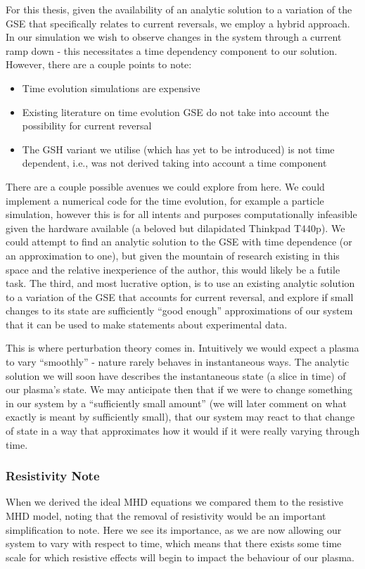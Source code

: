 For this thesis, given the availability of an analytic solution to a variation of 
the GSE that specifically relates to current reversals, we employ a hybrid approach. 
In our simulation we wish to observe changes in the system through a current ramp down
- this necessitates a time dependency component to our solution. However, there are 
a couple points to note:
\begin{itemize}
    \item Time evolution simulations are expensive
    \item Existing literature on time evolution GSE do not take into account the possibility for current 
    reversal
    \item The GSH variant we utilise (which has yet to be introduced) is not time dependent, i.e., 
    was not derived taking into account a time component
\end{itemize}

There are a couple possible avenues we could explore from here. We could implement a numerical code 
for the time evolution, for example a particle simulation, however this is for all intents and purposes
computationally infeasible given the hardware available (a beloved but dilapidated Thinkpad T440p). We could 
attempt to find an analytic solution to the GSE with time dependence (or an approximation to one),
but given the mountain of research existing in this space and the relative inexperience 
of the author, this would likely be a futile task. The third, and most lucrative option, 
is to use an existing analytic solution to a variation of the GSE that accounts for 
current reversal, and explore if small changes to its state
are sufficiently ``good enough'' approximations of our system that it can be used to make 
statements about experimental data.

This is where perturbation theory comes in. Intuitively we would expect a 
plasma to vary ``smoothly'' - nature rarely behaves in instantaneous ways. The 
analytic solution we will soon have describes the instantaneous state (a slice in time) of 
our plasma's state. We may anticipate then that if we were to change something 
in our system by a ``sufficiently small amount'' (we will later comment on what exactly is meant by sufficiently small), 
that our system may react to that change of state in a way that approximates how it would if it 
were really varying through time. 

\subsubsection{Resistivity Note}
When we derived the ideal MHD equations we compared them to the resistive MHD model, noting that 
the removal of resistivity would be an important simplification to note. Here we see its importance, as 
we are now allowing our system to vary with respect to time, which means that there exists some time scale 
for which resistive effects will begin to impact the behaviour of our plasma. 

